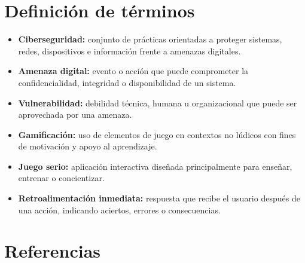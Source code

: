 \documentclass[12pt]{article}
\begin{document}
\onehalfspacing

\tableofcontents
\newpage




\section{Definición de términos}

\begin{itemize}
    \item \textbf{Ciberseguridad:} conjunto de prácticas orientadas a proteger sistemas, redes, dispositivos e información frente a amenazas digitales.
    \item \textbf{Amenaza digital:} evento o acción que puede comprometer la confidencialidad, integridad o disponibilidad de un sistema.
    \item \textbf{Vulnerabilidad:} debilidad técnica, humana u organizacional que puede ser aprovechada por una amenaza.
    \item \textbf{Gamificación:} uso de elementos de juego en contextos no lúdicos con fines de motivación y apoyo al aprendizaje.
    \item \textbf{Juego serio:} aplicación interactiva diseñada principalmente para enseñar, entrenar o concientizar.
    \item \textbf{Retroalimentación inmediata:} respuesta que recibe el usuario después de una acción, indicando aciertos, errores o consecuencias.
\end{itemize}

\newpage
\section{Referencias}
\end{document}
